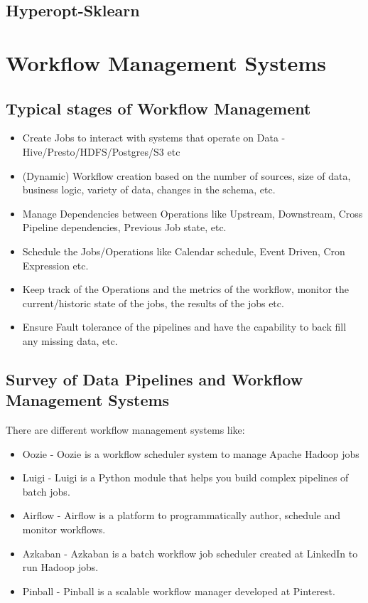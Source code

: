 \documentclass[10pt,onecolumn]{IEEEtran}
\begin{document}
\subsection{Hyperopt-Sklearn}



\section{Workflow Management Systems}
\subsection{Typical stages of Workflow Management}
\begin{itemize}
\item Create Jobs to interact with systems that operate on Data - Hive/Presto/HDFS/Postgres/S3 etc
\item (Dynamic) Workflow creation based on the number of sources, size of data, business logic, variety of data, changes in the schema, etc.
\item Manage Dependencies between Operations like Upstream, Downstream, Cross Pipeline dependencies, Previous Job state, etc.
\item Schedule the Jobs/Operations like Calendar schedule, Event Driven, Cron Expression etc.
\item Keep track of the Operations and the metrics of the workflow, monitor the current/historic state of the jobs, the results of the jobs etc.
\item Ensure Fault tolerance of the pipelines and have the capability to back fill any missing data, etc.
\end{itemize}
   
\subsection{Survey of Data Pipelines and Workflow Management Systems}
There are different workflow management systems like:
\begin{itemize}
\item Oozie - Oozie is a workflow scheduler system to manage Apache Hadoop jobs
\item Luigi - Luigi is a Python module that helps you build complex pipelines of batch jobs.
\item Airflow - Airflow is a platform to programmatically author, schedule and monitor workflows.
\item Azkaban - Azkaban is a batch workflow job scheduler created at LinkedIn to run Hadoop jobs.
\item Pinball - Pinball is a scalable workflow manager developed at Pinterest.
\end{itemize}
\end{document}
